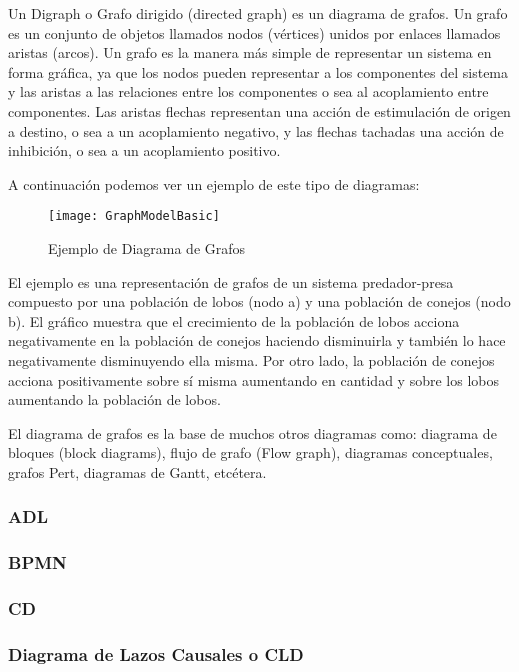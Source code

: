Un Digraph o Grafo dirigido (directed graph) es un diagrama de grafos. Un grafo es un conjunto de objetos llamados nodos (vértices) unidos por enlaces llamados aristas (arcos). Un grafo es la manera más simple de representar un sistema en forma gráfica, ya que los nodos pueden representar a los componentes del sistema y las aristas a las relaciones entre los componentes o sea al acoplamiento entre componentes. Las aristas flechas representan una acción de estimulación de origen a destino, o sea a un acoplamiento negativo, y las flechas tachadas una acción de inhibición, o sea a un acoplamiento positivo.

A continuación podemos ver un ejemplo de este tipo de diagramas:

\begin{figure}[h]
  \centering
  \texttt{[image: GraphModelBasic]}
  \caption{Ejemplo de Diagrama de Grafos}
  \centering
  \label{fig:GraphModelBasic} %
\end{figure}

El ejemplo es una representación de grafos de un sistema predador-presa compuesto por una población de lobos (nodo a) y una población de conejos (nodo b). El gráfico muestra que el crecimiento de la población de lobos acciona negativamente en la población de conejos haciendo disminuirla y también lo hace negativamente disminuyendo ella misma. Por otro lado, la población de conejos acciona positivamente sobre sí misma aumentando en cantidad y sobre los lobos aumentando la población de lobos.

El diagrama de grafos es la base de muchos otros diagramas como: diagrama de bloques (block diagrams), flujo de grafo (Flow graph), diagramas conceptuales, grafos Pert, diagramas de Gantt, etcétera.


\subsubsection{ADL}

\subsubsection{BPMN}

\subsubsection{CD}

\subsubsection{Diagrama de Lazos Causales o CLD}

